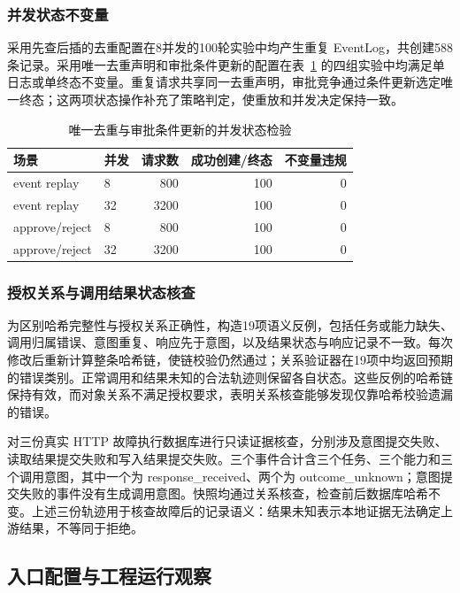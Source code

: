 \subsubsection{并发状态不变量}

采用先查后插的去重配置在8并发的100轮实验中均产生重复 EventLog，共创建588条记录。采用唯一去重声明和审批条件更新的配置在表~\ref{tab:concurrency-v11} 的四组实验中均满足单日志或单终态不变量。重复请求共享同一去重声明，审批竞争通过条件更新选定唯一终态；这两项状态操作补充了策略判定，使重放和并发决定保持一致。

\begin{table}[htbp]
\centering
\caption{唯一去重与审批条件更新的并发状态检验}
\label{tab:concurrency-v11}
\small
\begin{tabular}{llrrr}
\toprule
场景 & 并发 & 请求数 & 成功创建/终态 & 不变量违规 \\
\midrule
event replay & 8 & 800 & 100 & 0 \\
event replay & 32 & 3200 & 100 & 0 \\
approve/reject & 8 & 800 & 100 & 0 \\
approve/reject & 32 & 3200 & 100 & 0 \\
\bottomrule
\end{tabular}
\end{table}

\subsubsection{授权关系与调用结果状态核查}
\label{sec:evidence-rr022}

为区别哈希完整性与授权关系正确性，构造19项语义反例，包括任务或能力缺失、调用归属错误、意图重复、响应先于意图，以及结果状态与响应记录不一致。每次修改后重新计算整条哈希链，使链校验仍然通过；关系验证器在19项中均返回预期的错误类别。正常调用和结果未知的合法轨迹则保留各自状态。这些反例的哈希链保持有效，而对象关系不满足授权要求，表明关系核查能够发现仅靠哈希校验遗漏的错误。

对三份真实 HTTP 故障执行数据库进行只读证据核查，分别涉及意图提交失败、读取结果提交失败和写入结果提交失败。三个事件合计含三个任务、三个能力和三个调用意图，其中一个为 response\_received、两个为 outcome\_unknown；意图提交失败的事件没有生成调用意图。快照均通过关系核查，检查前后数据库哈希不变。上述三份轨迹用于核查故障后的记录语义：结果未知表示本地证据无法确定上游结果，不等同于拒绝。

\subsection{入口配置与工程运行观察}
\label{sec:engineering-rr022}

